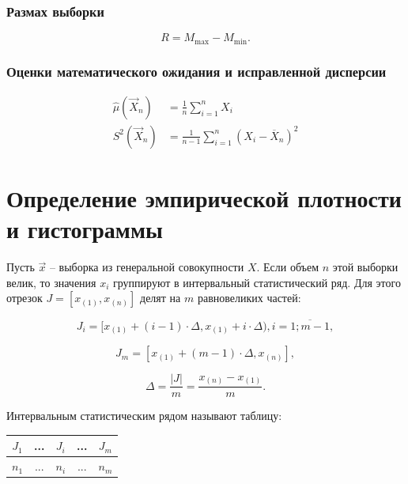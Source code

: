 \documentclass[12pt]{report}
\begin{document}
\subsubsection{Размах выборки}
\begin{equation}
    R = M_{\max} - M_{\min}.
\end{equation}

\subsubsection{Оценки математического ожидания и исправленной дисперсии}
\begin{equation}
    \begin{aligned}
    \hat\mu(\vec X_n) &= \frac 1n \sum_{i=1}^n X_i\\
    S^2(\vec X_n) &= \frac 1{n-1} \sum_{i=1}^n (X_i-\overline X_n)^2
    \end{aligned}
\end{equation}

\section{Определение эмпирической плотности и гистограммы}

Пусть $\vec x$ -- выборка из генеральной совокупности $X$. Если объем $n$ этой выборки велик, то значения $x_i$ группируют в интервальный статистический ряд. Для этого отрезок $J = [x_{(1)}, x_{(n)}]$ делят на $m$ равновеликих частей:

\begin{equation*}
    J_i = [x_{(1)} + (i - 1) \cdot \Delta, x_{(1)} + i \cdot \Delta), i = \overline{1; m - 1},
\end{equation*}

\begin{equation*}
    J_{m} = [x_{(1)} + (m - 1) \cdot \Delta, x_{(n)}],
\end{equation*}

\begin{equation*}
    \Delta = \frac{|J|}{m} = \displaystyle\frac{x_{(n)} - x_{(1)}}{m}.
\end{equation*}

Интервальным статистическим рядом называют таблицу:

\begin{table}[htb]
    \centering
    \begin{tabular}{|c|c|c|c|c|}
        \hline
        $J_1$ & ... & $J_i$ & ... & $J_m$ \\
        \hline
        $n_1$ & ... & $n_i$ & ... & $n_m$ \\
        \hline
    \end{tabular}
\end{table}
\end{document}
